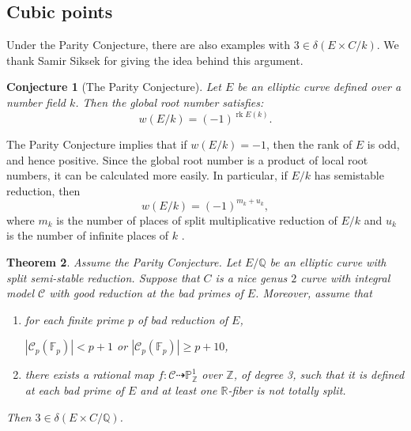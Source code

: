 \documentclass[a4paper,11pt]{amsart}
\theoremstyle{plain}
\newtheorem{thm}{Theorem}[section]
\newtheorem{conj}[thm]{Conjecture}
\theoremstyle{remark}
\newcommand{\rk}{\operatorname{rk}}
\newcommand{\dendegs}{\delta}
\begin{document}
\subsection{Cubic points}

Under the Parity Conjecture, there are also examples with $3 \in \dendegs(E \times C/k)$.  We thank Samir Siksek for giving the idea behind this argument.

\begin{conj}[The Parity Conjecture]
Let \(E\) be an elliptic curve defined over a number field \(k\).  Then the global root number satisfies:
\[w(E/k) = (-1)^{\rk E(k)}.\]
\end{conj}

The Parity Conjecture implies that if \(w(E/k) = -1\), then the rank of \(E\) is odd, and hence positive.  Since the global root number is a product of local root numbers, it can be calculated more easily.  In particular, if \(E/k\) has semistable reduction, then
\begin{equation}\label{eq:Sven'sthm}
w(E/k) = (-1)^{m_k + u_k},
\end{equation}
where \(m_k\) is the number of places of split multiplicative reduction of \(E/k\) and \(u_k\) is the number of infinite places of \(k\)
\cite[Corollary 2.5]{DokchitserKellock}.

\begin{thm}\label{thm:parity_3}
    Assume the Parity Conjecture. 
    Let $E/\mathbb{Q}$ be an elliptic curve with split 
    semi-stable reduction.  Suppose that $C$ is a nice genus \(2\) curve with integral model $\mathcal{C}$ with good reduction at the bad primes of $E$. 
    Moreover, assume that 
    \begin{enumerate}
    \item for each finite prime $p$ of bad reduction of $E$, 
    \begin{center}
        $|\mathcal{C}_p(\mathbb{F}_{p})| < p + 1$ or $|\mathcal{C}_p(\mathbb{F}_{p})| \geq p + 10$,
    \end{center}
    \item there exists a rational map $f : \mathcal{C} \dashrightarrow \mathbb{P}^1_{\mathbb{Z}}$ over $\mathbb{Z}$, of degree 3, such that it is defined at each bad prime of $E$ and at least one $\mathbb{R}$-fiber is not totally split.
    \end{enumerate}
    Then $3 \in \dendegs(E \times C/\mathbb{Q})$.
\end{thm}
 
\end{document}
